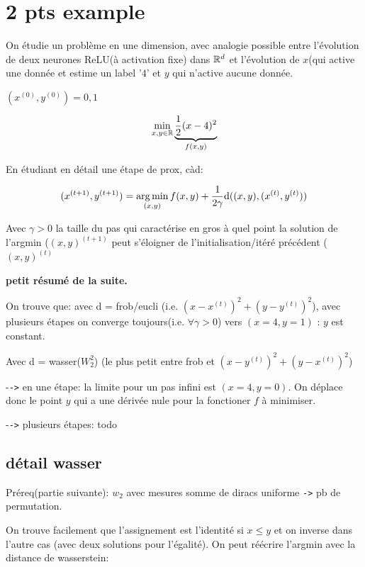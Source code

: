 \section{2 pts example}

On étudie un problème en une dimension, avec analogie possible entre l'évolution de deux neurones ReLU(à activation fixe) dans $\mathbb{R}^d$ et l'évolution de $x$(qui active une donnée et estime un label '$4$' et $y$ qui n'active aucune donnée.

$(x^{(0)}, y^{(0)}) = 0, 1$

\begin{equation}
	\min_{x,y \in \mathbb{R}} \underbrace{\frac{1}{2}(x - 4)^2}_{f(x, y)}
\end{equation}

En étudiant en détail une étape de prox, càd:

\begin{equation}
	(x^{(t+1)}, y^{(t+1)}) = \operatorname*{arg\,min}_{(x, y)} f(x, y) + \frac{1}{2 \gamma} \mathrm{d}((x,y),(x^{(t)}, y^{(t)}))
\end{equation}

Avec $\gamma > 0$ la taille du pas qui caractérise en gros à quel point la solution de l'argmin ($(x,y)^{(t+1)}$ peut s'éloigner de l'initialisation/itéré précédent ($(x,y)^{(t)}$

\textbf{petit résumé de la suite.}

On trouve que: avec d = frob/eucli (i.e. $(x-x^{(t)})^2 + (y-y^{(t)})^2$), avec plusieurs étapes on converge toujours(i.e. $\forall \gamma > 0$) vers $(x=4, y=1)$ : $y$ est constant.

Avec d = wasser($W^2_2$) (le plus petit entre frob et $(x-y^{(t)})^2 + (y-x^{(t)})^2$)

-\verb|->| en une étape: la limite pour un pas infini est $(x=4, y=0)$. On déplace donc le point $y$ qui a une dérivée nule pour la fonctioner $f$ à minimiser.

-\verb|->| plusieurs étapes: todo

\subsection{détail wasser}

Préreq(partie suivante): $w_2$ avec mesures somme de diracs uniforme \verb|->| pb de permutation.

On trouve facilement que l'assignement est l'identité si $x \leq  y$ et on inverse dans l'autre cas (avec deux solutions pour l'égalité). On peut réécrire l'argmin avec la distance de wasserstein:

